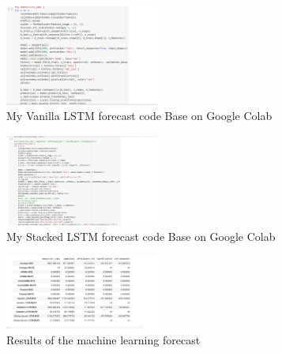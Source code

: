 \documentclass[12pt]{report}
\begin{document}
\begin{figure}[H]%
  \begin {center}
  \includegraphics[width=0.45\textwidth]{images/VanillaLSTM.PNG}
  \caption{My Vanilla LSTM forecast code Base on Google Colab}
  \label{fig:ecg}
  \end {center}
\end{figure}

\begin{figure}[H]%
  \begin {center}
  \includegraphics[width=0.45\textwidth]{images/StackedLSTM.PNG}
  \caption{My Stacked LSTM forecast code Base on Google Colab}
  \label{fig:ecg}
  \end {center}
\end{figure}


\begin{figure}[H]%
  \begin {center}
  \includegraphics[width=0.45\textwidth]{images/MSEresults.PNG}
  \caption{Results of the machine learning forecast}
  \label{fig:ecg}
  \end {center}
\end{figure}
\end{document}
